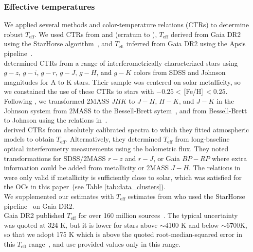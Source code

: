 \documentclass{aa}
\begin{document}
\subsubsection{Effective temperatures}
We applied several methods and color-temperature relations (CTRs) to determine robust $T_\mathrm{eff}$. We used CTRs from \citet{boyajian_stellar_2013} and \citet{mann_erratum_2016} (erratum to \citealt{mann_how_2015}), $T_\mathrm{eff}$ derived from Gaia DR2 using the StarHorse algorithm~\citep{queiroz_starhorse_2018}, and $T_\mathrm{eff}$ inferred from Gaia DR2 using the Apsis pipeline~\citep{bailerjones_apsis_2013, andrae_gaiaapsis_2018}.
\\
\citet{boyajian_stellar_2013} determined CTRs from a range of interferometrically characterized stars using $g-z$, $g-i$, $g-r$, $g-J$, $g-H$, and $g-K$ colors from SDSS and Johnson magnitudes for A to K stars. Their sample was centered on solar metallicity, so we constained the use of these CTRs to stars with $-0.25<$\,[Fe/H]$\,<0.25$. Following \citet{boyajian_stellar_2013}, we transformed 2MASS $JHK$ to $J-H$, $H-K$, and $J-K$ in the Johnson system from 2MASS to the Bessell-Brett sytem~\citep{carpenter_color_2001}, and from Bessell-Brett to Johnson using the relations in~\citet{bessell_brett_1988}. 
\\
\citet{mann_how_2015} derived CTRs from absolutely calibrated spectra to which they fitted atmospheric models to obtain $T_\mathrm{eff}$. Alternatively, they determined $T_\mathrm{eff}$ from long-baseline optical interferometry measurements using the bolometric flux. They noted transformations for SDSS/2MASS $r-z$ and $r-J$, or Gaia $BP-RP$ where extra information could be added from metallicity or 2MASS $J-H$. The relations in \citet{mann_how_2015} were only valid if metallicity is sufficiently close to solar, which was satisfied for the OCs in this paper~(see Table \ref{tab:data_clusters}). 
\\
We supplemented our estimates with $T_\mathrm{eff}$ estimates from \citet{anders_starhorse_2019} who used the StarHorse pipeline~\citep{queiroz_starhorse_2018} on Gaia DR2.
\\
Gaia DR2 published $T_\mathrm{eff}$ for over 160 million sources~\citep{gaia_dr2_release_2018}. The typical uncertainty was quoted at 324 K, but it is lower for stars above $\sim$4100 K and below $\sim$6700K, so that we adopt 175 K which is above the quoted root-median-squared error in this $T_\mathrm{eff}$ range~\citep{andrae_gaiaapsis_2018}, and use provided values only in this range.
\\
\end{document}
